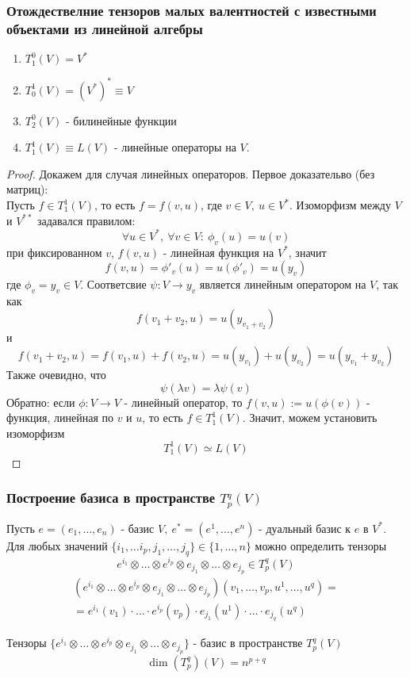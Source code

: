 \subsubsection*{Отождествелние тензоров малых валентностей с известными объектами из линейной алгебры}
\begin{theorem}
    \begin{enumerate}
        \item $T_1^0(V)=V^*$
        \item $T_0^1(V)=(V^*)^* \equiv V$
        \item $T_2^0(V)$ - билинейные функции
        \item $T_1^1(V) \equiv L(V)$ - линейные операторы на $V$.
    \end{enumerate}
\end{theorem} 
\begin{proof}
    Докажем для случая линейных операторов. Первое доказательво (без матриц):\\
    Пусть $f\in T_1^1(V)$, то есть $f=f(v,u)$, где $v\in V,\ u\in V^*$. Изоморфизм между $V$ и $V^{**}$ задавался правилом:
    \[\forall u\in V^*,\ \forall v\in V:\ \phi_v(u)=u(v)\]
    при фиксированном $v$, $f(v,u)$ - линейная функция на $V^*$, значит
    \[f(v,u)=\phi'_v(u)=u(\phi'_v)=u(y_v)\] %
    где $\phi_v=y_v\in V$. Соответсвие $\psi: V\to y_v$ является линейным оператором на $V$, так как 
    \[f(v_1+v_2,u)=u(y_{v_1+v_2})\]
    и 
    \[f(v_1+v_2,u)=f(v_1,u)+f(v_2,u)=u(y_{v_1})+u(y_{v_2})=u(y_{v_1}+y_{v_2})\]
    Также очевидно, что 
    \[\psi(\lambda v)=\lambda\psi(v)\]
    Обратно: если $\phi: V\to V$ - линейный оператор, то $f(v,u):=u(\phi(v))$ - функция, линейная по $v$ и $u$, то есть $f\in T^1_1(V)$. Значит, можем установить изоморфизм
    \[T_1^1(V)\simeq L(V)\]
\end{proof} 
\subsubsection*{Построение базиса в пространстве $T_p^q(V)$}
Пусть $e=(e_1,\dots,e_n)$ - базис $V,\ e^*=(e^1,\dots,e^n)$ - дуальный базис к $e$ в $V^*$.
Для любых значений $\{i_1,\dots i_p,j_1,\dots,j_q\}\in \{1,\dots,n\}$ можно определить тензоры
\[e^{i_1}\otimes \dots \otimes e^{i_p}\otimes e_{j_1}\otimes \dots\otimes e_{j_p}\in T_p^q(V)\]
\begin{multline*}
    (e^{i_1}\otimes \dots \otimes e^{i_p}\otimes e_{j_1}\otimes \dots\otimes e_{j_p})(v_1,\dots,v_p,u^1,\dots,u^q)=\\
    =e^{i_1}(v_1)\cdot \dots \cdot e^{i_p}(v_p)\cdot e_{j_1}(u^1)\cdot \dots \cdot e_{j_q}(u^q)
\end{multline*}
\begin{theorem}
    Тензоры $\{e^{i_1}\otimes \dots \otimes e^{i_p}\otimes e_{j_1}\otimes \dots\otimes e_{j_p}\}$ - базис в пространстве $T_p^q(V)$
    \[\dim{(T_p^q)}(V)=n^{p+q}\]
\end{theorem} 